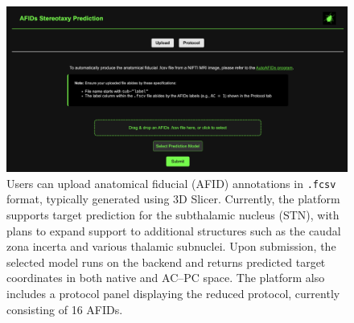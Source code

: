 \begin{figure}[hbt!]
    \centering
    \includegraphics[width=1\linewidth]{figs/figuresupstereotaxy.png}
    \caption{Users can upload anatomical fiducial (AFID) annotations in \texttt{.fcsv} format, typically generated using 3D Slicer. Currently, the platform supports target prediction for the subthalamic nucleus (STN), with plans to expand support to additional structures such as the caudal zona incerta and various thalamic subnuclei. Upon submission, the selected model runs on the backend and returns predicted target coordinates in both native and AC--PC space. The platform also includes a protocol panel displaying the reduced protocol, currently consisting of 16 AFIDs.}
    \label{fig:figuresupstereotaxy}
\end{figure}